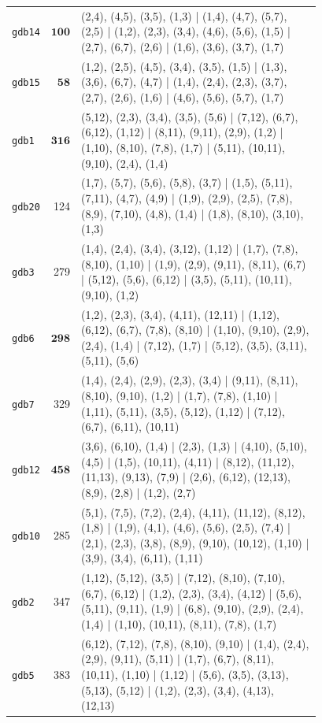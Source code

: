 \begin{landscape}
\begin{longtable}{lr>{\tiny\raggedright\arraybackslash}p{0.78\linewidth}}
\texttt{gdb14} & $\mathbf{100}$ & (2,4), (4,5), (3,5), (1,3) | (1,4), (4,7), (5,7), (2,5) | (1,2), (2,3), (3,4), (4,6), (5,6), (1,5) | (2,7), (6,7), (2,6) | (1,6), (3,6), (3,7), (1,7) \\[2pt]
\texttt{gdb15} & $\mathbf{58}$ & (1,2), (2,5), (4,5), (3,4), (3,5), (1,5) | (1,3), (3,6), (6,7), (4,7) | (1,4), (2,4), (2,3), (3,7), (2,7), (2,6), (1,6) | (4,6), (5,6), (5,7), (1,7) \\[2pt]
\texttt{gdb1} & $\mathbf{316}$ & (5,12), (2,3), (3,4), (3,5), (5,6) | (7,12), (6,7), (6,12), (1,12) | (8,11), (9,11), (2,9), (1,2) | (1,10), (8,10), (7,8), (1,7) | (5,11), (10,11), (9,10), (2,4), (1,4) \\[2pt]
\texttt{gdb20} & 124 & (1,7), (5,7), (5,6), (5,8), (3,7) | (1,5), (5,11), (7,11), (4,7), (4,9) | (1,9), (2,9), (2,5), (7,8), (8,9), (7,10), (4,8), (1,4) | (1,8), (8,10), (3,10), (1,3) \\[2pt]
\texttt{gdb3} & 279 & (1,4), (2,4), (3,4), (3,12), (1,12) | (1,7), (7,8), (8,10), (1,10) | (1,9), (2,9), (9,11), (8,11), (6,7) | (5,12), (5,6), (6,12) | (3,5), (5,11), (10,11), (9,10), (1,2) \\[2pt]
\texttt{gdb6} & $\mathbf{298}$ & (1,2), (2,3), (3,4), (4,11), (12,11) | (1,12), (6,12), (6,7), (7,8), (8,10) | (1,10), (9,10), (2,9), (2,4), (1,4) | (7,12), (1,7) | (5,12), (3,5), (3,11), (5,11), (5,6) \\[2pt]
\texttt{gdb7} & 329 & (1,4), (2,4), (2,9), (2,3), (3,4) | (9,11), (8,11), (8,10), (9,10), (1,2) | (1,7), (7,8), (1,10) | (1,11), (5,11), (3,5), (5,12), (1,12) | (7,12), (6,7), (6,11), (10,11) \\[2pt]
\texttt{gdb12} & $\mathbf{458}$ & (3,6), (6,10), (1,4) | (2,3), (1,3) | (4,10), (5,10), (4,5) | (1,5), (10,11), (4,11) | (8,12), (11,12), (11,13), (9,13), (7,9) | (2,6), (6,12), (12,13), (8,9), (2,8) | (1,2), (2,7) \\[2pt]
\texttt{gdb10} & 285 & (5,1), (7,5), (7,2), (2,4), (4,11), (11,12), (8,12), (1,8) | (1,9), (4,1), (4,6), (5,6), (2,5), (7,4) | (2,1), (2,3), (3,8), (8,9), (9,10), (10,12), (1,10) | (3,9), (3,4), (6,11), (1,11) \\[2pt]
\texttt{gdb2} & 347 & (1,12), (5,12), (3,5) | (7,12), (8,10), (7,10), (6,7), (6,12) | (1,2), (2,3), (3,4), (4,12) | (5,6), (5,11), (9,11), (1,9) | (6,8), (9,10), (2,9), (2,4), (1,4) | (1,10), (10,11), (8,11), (7,8), (1,7) \\[2pt]
\texttt{gdb5} & 383 & (6,12), (7,12), (7,8), (8,10), (9,10) | (1,4), (2,4), (2,9), (9,11), (5,11) | (1,7), (6,7), (8,11), (10,11), (1,10) | (1,12) | (5,6), (3,5), (3,13), (5,13), (5,12) | (1,2), (2,3), (3,4), (4,13), (12,13) \\[2pt]

\end{longtable}
\end{landscape}
